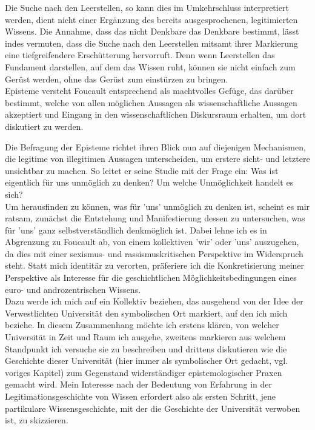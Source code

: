 Die Suche nach den
Leerstellen, so kann dies im Umkehrschluss interpretiert werden, dient nicht
einer Ergänzung des bereits ausgesprochenen, legitimierten Wissens. Die Annahme,
dass das nicht Denkbare das Denkbare bestimmt, lässt indes vermuten, dass die
Suche nach den Leerstellen mitsamt ihrer Markierung eine tiefgreifendere
Erschütterung hervorruft. Denn wenn Leerstellen das Fundament darstellen, auf
dem das Wissen ruht, können sie nicht einfach zum Gerüst werden, ohne das Gerüst
zum einstürzen zu bringen.\\
Episteme versteht Foucault entsprechend als machtvolles Gefüge, das darüber
bestimmt, welche von allen möglichen Aussagen als wissenschaftliche Aussagen
akzeptiert und Eingang in den wissenschaftlichen Diskursraum erhalten, um dort
diskutiert zu werden.\footnotemark {} 


Die Befragung der Episteme richtet ihren Blick nun auf diejenigen Mechanismen,
die legitime von illegitimen Aussagen unterscheiden, um erstere sicht- und
letztere unsichtbar zu machen. So leitet er seine Studie mit der Frage ein:
\glqq Was ist eigentlich für uns unmöglich zu denken? Um welche Unmöglichkeit
handelt es sich? \grqq \footnotemark {} 
\\

Um herausfinden zu können, was für 'uns' unmöglich zu denken ist, scheint es mir
ratsam, zunächst die Entstehung und Manifestierung dessen zu untersuchen, was
für 'uns' ganz selbstverständlich denkmöglich ist. Dabei lehne ich es in
Abgrenzung zu Foucault ab, von einem kollektiven 'wir' oder 'uns' auszugehen, da
dies mit einer sexismus- und rassismuskritischen Perspektive im Widerspruch
steht. Statt mich identitär zu verorten, präferiere ich die Konkretisierung
meiner Perspektive als Interesse für die geschichtlichen Möglichkeitsbedingungen
eines euro- und androzentrischen Wissens. \\
Dazu werde ich mich auf ein Kollektiv
beziehen, das ausgehend von der Idee der \glqq Verwestlichten Universität \grqq 
\footnotemark {} den 
symbolischen Ort markiert, auf den ich mich beziehe. In diesem Zusammenhang
möchte ich erstens klären, von welcher Universität in Zeit und Raum ich ausgehe,
zweitens markieren aus welchem Standpunkt ich versuche sie zu beschreiben und
drittens diskutieren wie die Geschichte dieser Universität (hier immer als
symbolischer Ort gedacht, vgl. voriges Kapitel) zum Gegenstand widerständiger
epistemologischer Praxen gemacht wird. Mein Interesse nach der Bedeutung von
Erfahrung in der Legitimationsgeschichte von Wissen erfordert also als ersten
Schritt, jene partikulare Wissensgeschichte,  mit der die Geschichte der
Universität verwoben ist, zu skizzieren.

